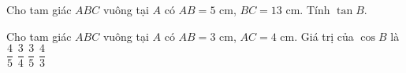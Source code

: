 \begin{bt}%
	Cho tam giác $ABC$ vuông tại $A$ có $AB=5\text{ cm}$, $BC=13\text{ cm}$. Tính $\tan B$.
\end{bt}

\begin{ex}%
	Cho tam giác $ABC$ vuông tại $A$ có $AB=3\text{ cm}$, $AC=4\text{ cm}$. Giá trị của $\cos B$ là
	\choice
	{$\dfrac45$}
	{$\dfrac34$}
	{\True $\dfrac35$}
	{$\dfrac43$}
\end{ex}
